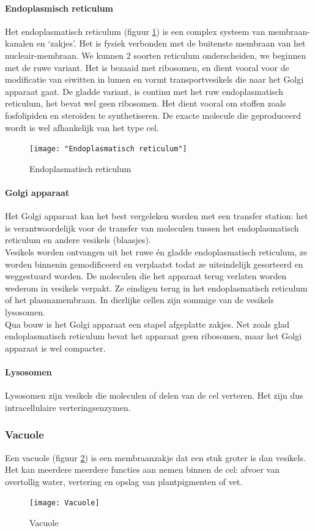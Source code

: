 \documentclass[a4paper,kul]{kulakarticle} %
\begin{document}
\paragraph{Endoplasmisch reticulum}
Het endoplasmatisch reticulum (figuur \ref{fig:endoplasmatisch-reticulum}) is een complex systeem van membraan-kanalen en `zakjes'. Het is fysiek verbonden met de buitenste membraan van het nucleair-membraan. We kunnen 2 soorten reticulum onderscheiden, we beginnen met de ruwe variant. Het is bezaaid met ribosomen, en dient vooral voor de modificatie van eiwitten in lumen en vormt transportvesikels die naar het Golgi apparaat gaat. De gladde variant, is continu met het ruw endoplasmatisch reticulum, het bevat wel geen ribosomen.  Het dient vooral om stoffen zoals fosfolipiden en steroïden te synthetiseren. De exacte molecule die geproduceerd wordt is wel afhankelijk van het type cel.  
\begin{figure}[h]
	\centering
	\texttt{[image: "Endoplasmatisch reticulum"]}
	\caption[Endoplasmatisch reticulum]{Endoplasmatisch reticulum}
	\label{fig:endoplasmatisch-reticulum}
\end{figure}

\paragraph{Golgi apparaat}
Het Golgi apparaat kan het best vergeleken worden met een transfer station: het is verantwoordelijk voor de transfer van moleculen tussen het endoplasmatisch reticulum en andere vesikels (blaasjes). \\
Vesikels worden ontvangen uit het ruwe én gladde endoplasmatisch reticulum, ze worden binnenin gemodificeerd en verplaatst todat ze uiteindelijk gesorteerd en weggestuurd worden. De moleculen die het apparaat terug verlaten worden wederom in vesikels verpakt. Ze eindigen terug in het endoplasmatisch reticulum of het plasmamembraan. In dierlijke cellen zijn sommige van de vesikels lysosomen.  \\
Qua bouw is het Golgi apparaat een stapel afgeplatte zakjes. Net zoals glad endoplasmatisch reticulum bevat het apparaat geen ribosomen, maar het Golgi apparaat is wel compacter.
\paragraph{Lysosomen}
Lysosomen zijn vesikels die moleculen of delen van de cel verteren. Het zijn dus intracellulaire verteringsenzymen.
\subsubsection{Vacuole}
Een vacuole (figuur \ref{fig:vacuole}) is een membraanzakje dat een stuk groter is dan vesikels. Het kan meerdere meerdere functies aan nemen binnen de cel: afvoer van overtollig water, vertering en opslag van plantpigmenten of vet.
\begin{figure}[!h]
	\centering
	\texttt{[image: Vacuole]}
	\caption[Vacuole]{Vacuole}
	\label{fig:vacuole}
\end{figure}
\newpage
\end{document}
